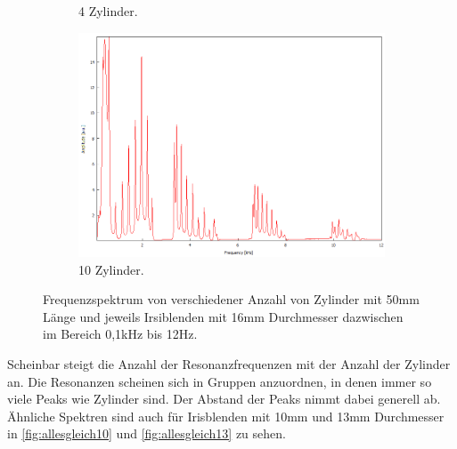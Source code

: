 \begin{figure}
\begin{subfigure}[b]{0.3\textwidth}
        \caption{4 Zylinder.}
    \end{subfigure}
    \hfill
    \begin{subfigure}[b]{0.3\textwidth}
        \centering
        \includegraphics[width=\textwidth]{data/4_1/10.png}
        \caption{10 Zylinder.}
    \end{subfigure}
    \hfill
    \caption{Frequenzspektrum von verschiedener Anzahl von Zylinder mit 50\;mm Länge und jeweils Irsiblenden mit 16\;mm Durchmesser dazwischen im Bereich 0,1\;kHz bis 12\;Hz.}
    \label{fig:allesgleich}
\end{figure}
Scheinbar steigt die Anzahl der Resonanzfrequenzen mit der Anzahl der Zylinder an. Die Resonanzen scheinen sich in
Gruppen anzuordnen, in denen immer so viele Peaks wie Zylinder sind. Der Abstand der Peaks nimmt
dabei generell ab. Ähnliche Spektren sind auch für Irisblenden mit 10\;mm und 13\;mm Durchmesser 
in \autoref{fig:allesgleich10} und \autoref{fig:allesgleich13} zu sehen.

